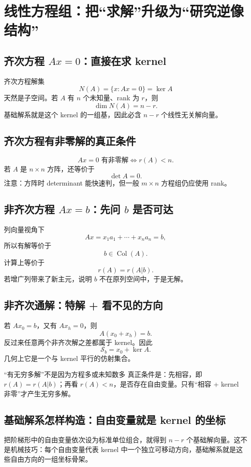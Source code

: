 \documentclass[11pt,a4paper,openany]{ctexbook}
\begin{document}
\chapter{线性方程组：把“求解”升级为“研究逆像结构”}

\section{齐次方程 $Ax=0$：直接在求 kernel}
齐次方程解集
\[
N(A)=\{x:Ax=0\}=\ker A
\]
天然是子空间。若 $A$ 有 $n$ 个未知量、rank 为 $r$，则
\[
\dim N(A)=n-r.
\]
基础解系就是这个 kernel 的一组基，因此必含 $n-r$ 个线性无关解向量。

\section{齐次方程有非零解的真正条件}
\[
Ax=0\text{ 有非零解}\iff r(A)<n.
\]
若 $A$ 是 $n\times n$ 方阵，还等价于
\[
\det A=0.
\]
注意：方阵时 determinant 能快速判，但一般 $m\times n$ 方程组仍应使用 rank。

\section{非齐次方程 $Ax=b$：先问 $b$ 是否可达}
列向量视角下
\[
Ax=x_1a_1+\cdots+x_na_n=b,
\]
所以有解等价于
\[
b\in\operatorname{Col}(A).
\]
计算上等价于
\[
\boxed{r(A)=r(A|b)}.
\]
若增广列带来了新主元，说明 $b$ 不在原列空间中，于是无解。

\section{非齐次通解：特解 + 看不见的方向}
若 $Ax_0=b$，又有 $Ax_h=0$，则
\[
A(x_0+x_h)=b.
\]
反过来任意两个非齐次解之差都属于 kernel。因此
\[
\boxed{\mathcal S_b=x_0+\ker A}.
\]
几何上它是一个与 kernel 平行的仿射集合。

\begin{boundarybox}{“有无穷多解”不是因为方程多或未知数多}
真正条件是：先相容，即 $r(A)=r(A|b)$；再看 $r(A)<n$，是否存在自由变量。只有“相容 + kernel 非零”才产生无穷多解。
\end{boundarybox}

\section{基础解系怎样构造：自由变量就是 kernel 的坐标}
把阶梯形中的自由变量依次设为标准单位组合，就得到 $n-r$ 个基础解向量。这不是机械技巧：每个自由变量代表 kernel 中一个独立可移动方向，基础解系就是这些自由方向的一组坐标骨架。
\end{document}
